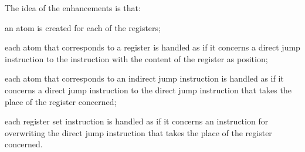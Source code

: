 \documentclass[fleqn]{llncs}
\begin{document}
The idea of the enhancements is that:
\begin{iteml}
\item
an atom is created for each of the registers;
\item
each atom that corresponds to a register is handled as if it concerns a
direct jump instruction to the instruction with the content of the
register as position;
\item
each atom that corresponds to an indirect jump instruction is handled as
if it concerns a direct jump instruction to the direct jump instruction
that takes the place of the register concerned;
\item
each register set instruction is handled as if it concerns an
instruction for overwriting the direct jump instruction that takes the
place of the register concerned.
\end{iteml}
\end{document}
